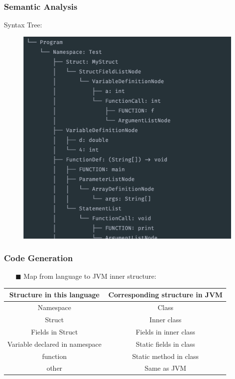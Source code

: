 \documentclass{beamer}
\begin{document}
\begin{frame}
    \frametitle{Semantic Analysis}
    Syntax Tree:
    \begin{figure}[h]
        \centering
        \includegraphics[scale=0.4]{assets/AST.png}
    \end{figure}
\end{frame}

\begin{frame}
    \frametitle{Code Generation}
    \begin{itemize}
        \item[$\blacksquare$] Map from language to JVM inner structure:
    \end{itemize}
    \centering
    \begin{tabular}{|c|c|} \hline
        Structure in this language & Corresponding structure in JVM  \\ \hline
        Namespace & Class \\ \hline
        Struct & Inner class\\ \hline
        Fields in Struct & Fields in inner class\\ \hline
        Variable declared in namespace & Static fields in class\\ \hline
        function & Static method in class \\ \hline
        other & Same as JVM \\ \hline
    \end{tabular}
\end{frame}
\end{document}
